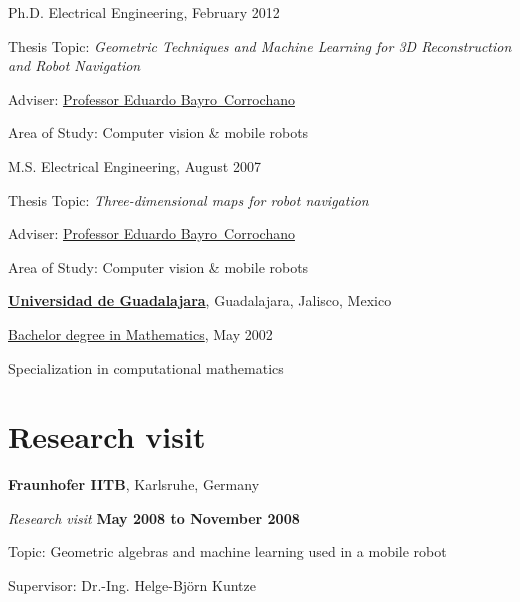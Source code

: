 \begin{outerlist}
\item[] Ph.D. Electrical Engineering, \hfill{February 2012}
        \begin{innerlist}
        \item Thesis Topic: \emph{Geometric Techniques and Machine Learning
              for 3D Reconstruction and Robot Navigation}
        \item Adviser:
              \href{https://unidad.gdl.cinvestav.mx/investigadores/investigador.php?inv=11}
                   {Professor Eduardo Bayro~Corrochano}
        \item Area of Study: Computer vision \& mobile robots
        \end{innerlist}

\item[] M.S. Electrical Engineering, \hfill{August 2007}
        \begin{innerlist}
        \item Thesis Topic: \emph{Three-dimensional maps for robot navigation}
        \item Adviser:
              \href{https://unidad.gdl.cinvestav.mx/investigadores/investigador.php?inv=11}
                   {Professor Eduardo Bayro~Corrochano}
        \item Area of Study: Computer vision \& mobile robots
        \end{innerlist}
\end{outerlist}

\blankline

\href{http://www.udg.mx/}{\textbf{Universidad de Guadalajara}},
Guadalajara, Jalisco, Mexico 

\begin{outerlist}
\item[] \href{http://www.cucei.udg.mx/es/oferta-academica/licenciaturas/licenciatura-en-matematicas}{Bachelor degree in Mathematics},
\hfill{May 2002}
        \begin{innerlist}
        \item Specialization in computational mathematics
        \end{innerlist}
\end{outerlist}

\section{Research visit}
%
\textbf{Fraunhofer IITB}, Karlsruhe, Germany
\begin{outerlist}
\item[] \textit{Research visit}%
    \hfill \textbf{May 2008 to November 2008}
    \begin{innerlist}
        \item Topic: Geometric algebras and machine learning used in a mobile
              robot
        \item Supervisor: Dr.-Ing. Helge-Bj{\"o}rn Kuntze
    \end{innerlist}
\end{outerlist}

